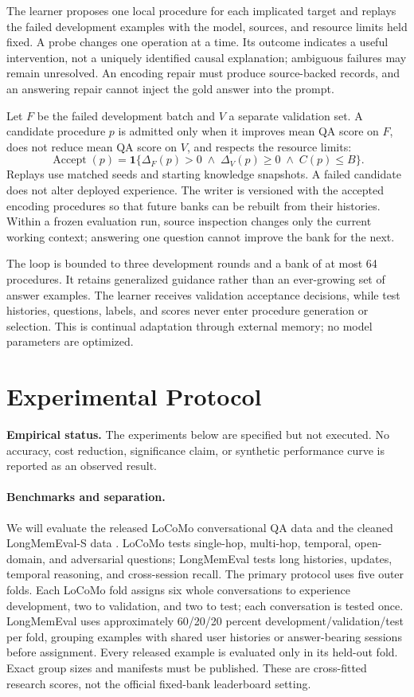 \documentclass{article}
\begin{document}
The learner proposes one local procedure for each implicated target and replays
the failed development examples with the model, sources, and resource limits
held fixed. A probe changes one operation at a time. Its outcome indicates a
useful intervention, not a uniquely identified causal explanation; ambiguous
failures may remain unresolved. An encoding repair must produce source-backed
records, and an answering repair cannot inject the gold answer into the prompt.

Let $F$ be the failed development batch and $V$ a separate validation set. A
candidate procedure $p$ is admitted only when it improves mean QA score on $F$,
does not reduce mean QA score on $V$, and respects the resource limits:
\begin{equation}
\operatorname{Accept}(p)=
\mathbf{1}\{\Delta_F(p)>0\;\land\;\Delta_V(p)\geq0\;\land\;C(p)\leq B\}.
\end{equation}
Replays use matched seeds and starting knowledge snapshots. A failed candidate
does not alter deployed experience. The writer is versioned with the accepted
encoding procedures so that future banks can be rebuilt from their histories.
Within a frozen evaluation run, source inspection changes only the current
working context; answering one question cannot improve the bank for the next.

The loop is bounded to three development rounds and a bank of at most 64
procedures. It retains generalized guidance rather than an ever-growing set of
answer examples. The learner receives validation acceptance decisions, while
test histories, questions, labels, and scores never enter procedure generation
or selection. This is continual adaptation through external memory; no model
parameters are optimized.

\section{Experimental Protocol}
\label{sec:experiments}
\textbf{Empirical status.} The experiments below are specified but not executed.
No accuracy, cost reduction, significance claim, or synthetic performance curve
is reported as an observed result.

\paragraph{Benchmarks and separation.}
We will evaluate the released LoCoMo conversational QA data
\citep{locomo} and the cleaned LongMemEval-S data \citep{longmemeval}.
LoCoMo tests single-hop, multi-hop, temporal, open-domain, and adversarial
questions; LongMemEval tests long histories, updates, temporal reasoning, and
cross-session recall. The primary protocol uses five outer folds. Each
LoCoMo fold assigns six whole conversations to experience development, two to
validation, and two to test; each conversation is tested once. LongMemEval
uses approximately 60/20/20 percent development/validation/test per fold,
grouping examples with shared user histories or answer-bearing sessions before
assignment. Every released example is evaluated only in its held-out fold.
Exact group sizes and manifests must be published. These are cross-fitted
research scores, not the official fixed-bank leaderboard setting.
\end{document}
